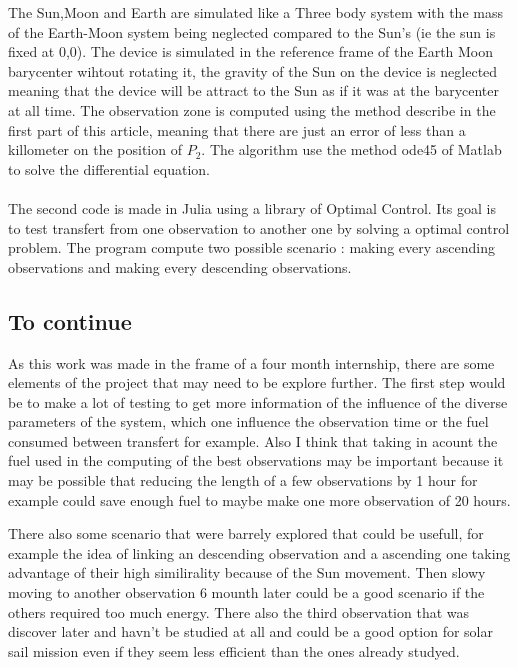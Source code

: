 \documentclass[11pt]{article} %
\begin{document}
			 The Sun,Moon and Earth are simulated like a Three body system with the mass of the Earth-Moon system being neglected compared to the Sun's (ie the sun is fixed at 0,0). The device is simulated in the reference frame of the Earth Moon barycenter wihtout rotating it, the gravity of the Sun on the device is neglected meaning that the device will be attract to the Sun as if it was at the barycenter at all time. 
			 The observation zone is computed using the method describe in the first part of this article, meaning that there are just an error of less than a killometer on the position of $P_2$.
			 The algorithm use the method ode45 of Matlab to solve the differential equation.
			 \\ \\
			 The second code is made in Julia using a library of Optimal Control. Its goal is to test transfert from one observation to another one by solving a optimal control problem. The program compute two possible scenario : making every ascending observations and making every descending observations.
			 
			 \subsection{To continue}
			 
			 As this work was made in the frame of a four month internship, there are some elements of the project that may need to be explore further.
			 The first step would be to make a lot of testing to get more information of the influence of the diverse parameters of the system, which one influence the observation time or the fuel consumed between transfert for example. Also I think that taking in acount the fuel used in the computing of the best observations may be important because it may be possible that reducing the length of a few observations by 1 hour for example could save enough fuel to maybe make one more observation of 20 hours.
			 
			 There also some scenario that were barrely explored that could be usefull, for example the idea of linking an descending observation and a ascending one taking advantage of their high similirality because of the Sun movement. Then slowy moving to another observation 6 mounth later could be a good scenario if the others required too much energy. There also the third observation that was discover later and havn't be studied at all and could be a good option for solar sail mission even if they seem less efficient than the ones already studyed.
	
\end{document}
